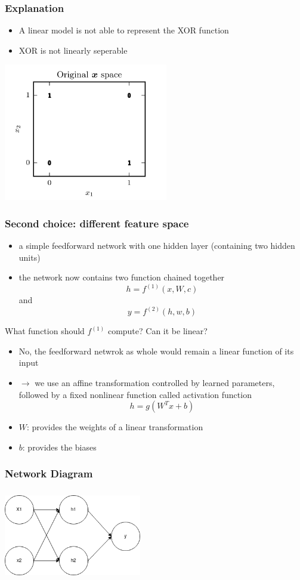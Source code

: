 \documentclass{beamer}
\begin{document}
\begin{frame}
	\frametitle{Explanation}
	\begin{itemize}
		\item A linear model is not able to represent the XOR function
		\item XOR is not linearly seperable
	\end{itemize}
	\center 
	\includegraphics[width = 80 mm, height = 60mm]{xor_graph1.png}
	
\end{frame}
\begin{frame}
	\frametitle{Second choice: different feature space}
	\begin{itemize}
		\item a simple feedforward network with one hidden layer (containing two hidden units)
		\item the network now contains two function chained together
			$$ h= f^{(1)}(x, W, c)$$ and $$ y = f^{(2)}(h, w, b)$$
	\end{itemize}
	\pause
	\center 
	What function should $f^{(1)}$ compute? Can it be linear?
\end{frame}
\begin{frame}
\begin{itemize}
	\item No, the feedforward netwrok as whole would remain a linear function of its input
		\pause
	\item $\rightarrow$ we use an affine transformation controlled by learned parameters, followed by a fixed nonlinear function called activation function $$h= g(W^Tx + b)$$
		\pause
	\item $W$: provides the weights of a linear transformation
	\item $b$: provides the biases
\end{itemize}
\end{frame}
\begin{frame}
	\frametitle{Network Diagram}
	\center 
	\includegraphics[width= 60mm, height=40mm]{xor_nn.png}	
\end{frame}
\end{document}
